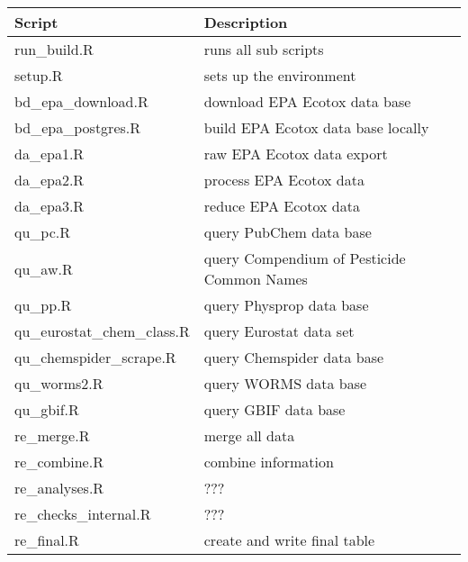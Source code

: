 \documentclass[english]{article}
\begin{document}
\begin{table}[]
\begin{tabular}{|l|l|}
\hline
Script                      & Description                                      \\ \hline
run_build.R                 & runs all sub scripts                             \\ \hline
setup.R                     & sets up the environment                          \\ \hline
bd\_epa\_download.R         & download EPA Ecotox data base                    \\ \hline
bd\_epa\_postgres.R         & build EPA Ecotox data base locally               \\ \hline
da\_epa1.R                  & raw EPA Ecotox data export                       \\ \hline
da\_epa2.R                  & process EPA Ecotox data                          \\ \hline
da\_epa3.R                  & reduce EPA Ecotox data                           \\ \hline
qu\_pc.R                    & query PubChem data base                          \\ \hline
qu\_aw.R                    & query Compendium of Pesticide Common Names       \\ \hline
qu\_pp.R                    & query Physprop data base                         \\ \hline
qu\_eurostat\_chem\_class.R & query Eurostat data set                          \\ \hline
qu\_chemspider\_scrape.R    & query Chemspider data base                       \\ \hline
qu\_worms2.R                & query WORMS data base                            \\ \hline
qu\_gbif.R                  & query GBIF data base                             \\ \hline
re\_merge.R                 & merge all data                                   \\ \hline
re\_combine.R               & combine information                              \\ \hline
re\_analyses.R              & ???                                              \\ \hline
re\_checks\_internal.R      & ???                                              \\ \hline
re\_final.R                 & create and write final table                     \\ \hline

\end{tabular}
\end{table}
\end{document}
